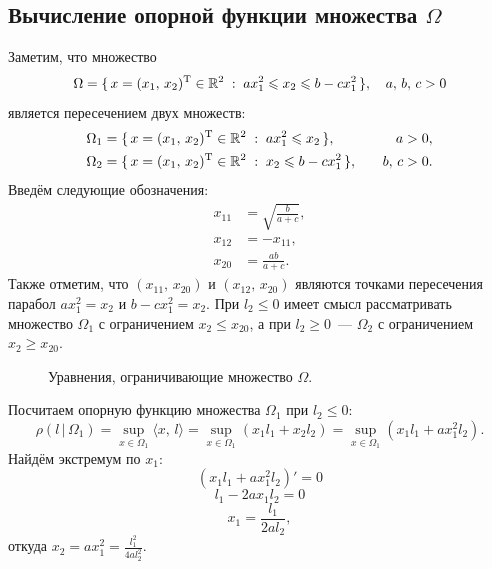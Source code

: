 \subsection{Вычисление опорной функции множества $\Omega$}

Заметим, что множество
$$
        \Omega = \{\,x = (x_1,\,x_2)^{\mathrm{T}} \in \mathbb{R}^2 \;:\; ax_1^2 \leqslant x_2 \leqslant b - cx_1^2\,\},\quad a,\,b,\,c > 0
$$
является пересечением двух множеств:
$$
\begin{aligned}
        &\Omega_1 = \{\,x = (x_1,\,x_2)^{\mathrm{T}} \in \mathbb{R}^2 \;:\; ax_1^2 \leqslant x_2\,\},\quad &a > 0,\\
        &\Omega_2 = \{\,x = (x_1,\,x_2)^{\mathrm{T}} \in \mathbb{R}^2 \;:\;  x_2 \leqslant b - cx_1^2\,\},\quad &b,\,c > 0.
\end{aligned}
$$
Введём следующие обозначения:
$$
\begin{aligned}
        x_{11} &= \sqrt{\frac{b}{a+c}},\\
        x_{12} &= -x_{11},\\
        x_{20} &= \frac{ab}{a+c}.
\end{aligned}
$$
Также отметим, что $(x_{11},\,x_{20})$ и $(x_{12},\,x_{20})$ являются точками пересечения парабол $ax_1^2 = x_2$ и $b - cx_1^2 = x_2$.
При $l_2 \leqslant 0$ имеет смысл рассматривать множество $\Omega_1$ с ограничением $x_2 \leqslant x_{20}$, а при $l_2 \geqslant 0$~--- $\Omega_2$ с ограничением $x_2 \geqslant x_{20}$.

\begin{figure}[h]
\caption{Уравнения, ограничивающие множество $\Omega$.}
\end{figure}

Посчитаем опорную функцию множества $\Omega_1$ при $l_2 \leqslant 0$:
$$
        \rho(l\,|\,\Omega_1) = 
        \sup\limits_{x \in \Omega_1}\langle x,\,l\rangle =
        \sup\limits_{x \in \Omega_1} (x_1l_1 + x_2l_2) =
        \sup\limits_{x \in \Omega_1}(x_1l_1 + ax_1^2l_2).
$$
Найдём экстремум по $x_1$:
$$
        (x_1l_1 + ax_1^2l_2)' = 0
$$
$$
        l_1 - 2ax_1l_2 = 0
$$
$$
        x_1 = \frac{l_1}{2al_2},
$$
откуда $x_2 = ax_1^2 = \frac{l_1^2}{4al_2^2}$.

